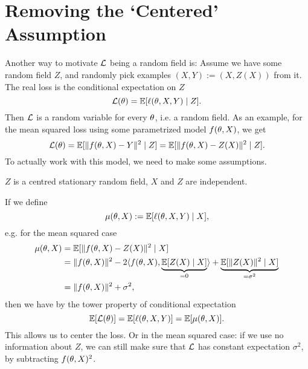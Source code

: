 \section{Removing the `Centered' Assumption}

Another way to motivate \(\mathcal{L}\) being a random field is: Assume we have some
random field \(Z\), and randomly pick examples
\((X,Y) := (X,Z(X))\) from it. The real loss is the conditional expectation on
\(Z\)
\begin{equation*}
	\mathcal{L}(\theta) = \mathbb{E}[\ell(\theta, X,Y)\mid Z].
\end{equation*}
Then \(\mathcal{L}\) is a random variable for every \(\theta\), i.e. a random field.
As an example, for the mean squared loss using some parametrized model
\(f(\theta, X)\), we get
\begin{equation*}
	\mathcal{L}(\theta)
	= \mathbb{E}[\|f(\theta, X) - Y\|^2 \mid Z]
	= \mathbb{E}[\|f(\theta, X) - Z(X)\|^2 \mid Z].
\end{equation*}
To actually work with this model, we need to make some assumptions.

\begin{axiom}
	\(Z\) is a centred stationary random field, \(X\) and \(Z\) are independent.
\end{axiom}

If we define
\begin{equation*}
	\mu(\theta, X):= \mathbb{E}[\ell(\theta, X,Y)\mid X],
\end{equation*}
e.g. for the mean squared case
\begin{align*}
	\mu(\theta, X)&= \mathbb{E}[\|f(\theta, X)-Z(X)\|^2 \mid X]\\
	&= \|f(\theta, X)\|^2 - 2\langle f(\theta, X), \underbrace{\mathbb{E}[Z(X)\mid X]}_{=0}\rangle
	+ \underbrace{\mathbb{E}[\|Z(X)\|^2\mid X]}_{=\sigma^2}\\
	&= \|f(\theta, X)\|^2 + \sigma^2,
\end{align*}
then we have by the tower property of conditional expectation
\begin{equation*}
	\mathbb{E}[\mathcal{L}(\theta)]
	= \mathbb{E}[\ell(\theta, X,Y)]
	= \mathbb{E}[\mu(\theta, X)].
\end{equation*}
This allows us to center the loss. Or in the mean squared case: if we use no
information about \(Z\), we can still make sure that \(\mathcal{L}\) has constant
expectation \(\sigma^2\), by subtracting \(f(\theta, X)^2\).